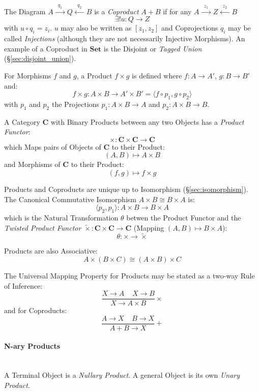 The Diagram $A \xrightarrow{\;\;q_1\;\;} Q \xleftarrow{\;\;q_2\;\;} B$
is a \emph{Coproduct} $A + B$ if for any $A \xrightarrow{\;\;z_1\;\;}
Z \xleftarrow{\;\;z_2\;\;} B$
\[
    \exists!u : Q \rightarrow Z
\]
with $u \circ q_i = z_i$. $u$ may also be written as $[ z_1, z_2 ]$
and Coprojections $q_i$ may be called \emph{Injections} (although they
are not necessarily Injective Morphisms). An example of a Coproduct in
$\mathbf{Set}$ is the Disjoint or \emph{Tagged Union}
(\S\ref{sec:disjoint_union}).

For Morphisms $f$ and $g$, a Product $f \times g$ is defined where $f
: A \rightarrow A'$, $g : B \rightarrow B'$ and:
\[
    f \times g : A \times B \rightarrow A' \times B' =
    \langle f \circ p_1, g \circ p_2 \rangle
\]
with $p_1$ and $p_2$ the Projections $p_1 : A \times B \rightarrow A$
and $p_2 : A \times B \rightarrow B$.

A Category $\mathbf{C}$ with Binary Products between any two Objects
has a \emph{Product Functor}:
\[
    \times : \mathbf{C} \times \mathbf{C} \rightarrow \mathbf{C}
\]
which Maps pairs of Objects of $\mathbf{C}$ to their Product:
\[
    (A,B) \mapsto A \times B
\]
and Morphisms of $\mathbf{C}$ to their Product:
\[
    (f,g) \mapsto f \times g
\]

Products and Coproducts are unique up to Isomorphism
(\S\ref{sec:isomorphism}). The Canonical Commutative Isomorphism $A
\times B \cong B \times A$ is:
\[
    \langle p_2, p_1 \rangle : A \times B \rightarrow B \times A
\]
which is the Natural Transformation $\theta$ betwen the Product
Functor and the \emph{Twisted Product Functor} $\tilde{\times} :
\mathbf{C} \times \mathbf{C} \rightarrow \mathbf{C}$ (Mapping $(A,B)
\mapsto B \times A$):
\[
    \theta : \times \rightarrow \tilde{\times}
\]

Products are also Associative:
\[
    A \times (B \times C) \cong (A \times B) \times C
\]

The Universal Mapping Property for Products may be stated as a two-way
Rule of Inference: %
\[
    {
        \frac{X \rightarrow A \;\;\;\; X \rightarrow B}
        {X \rightarrow A \times B}
    }\times
\]
and for Coproducts:
\[
    {
        \frac{A \rightarrow X \;\;\;\; B \rightarrow X}
        {A + B \rightarrow X}
    }+
\]

\paragraph{N-ary Products}\label{sec:category_nary}
\hfill \\
A Terminal Object is a \emph{Nullary Product}. A general Object is its
own \emph{Unary Product}.


